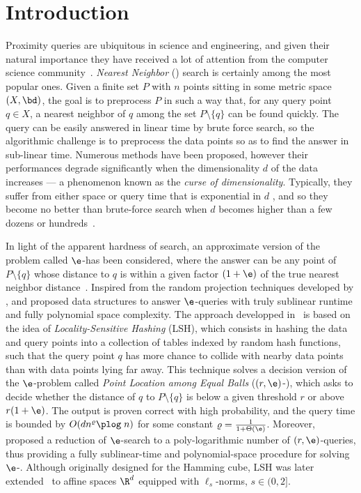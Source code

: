 \section{Introduction}


Proximity queries are ubiquitous in science and engineering, and given
their natural importance they have received a lot of attention from
the computer science community~\citep{Clarkson99, Clarkson06, Indyk04,
  SDI05}. {\em Nearest Neighbor} (\nn) search is certainly among the
most popular ones. Given a finite set $P$ with $n$ points sitting in
some metric space $(X,\bd)$, the goal is to preprocess $P$ in such a
way that, for any query point $q\in X$, a nearest neighbor of $q$
among the set $P\setminus\{q\}$ can be found quickly.  The \nn query
can be easily answered in linear time by brute force search, so the
algorithmic challenge is to preprocess the data points so as to find
the answer in sub-linear time. Numerous methods have been proposed,
however their performances degrade significantly when the
dimensionality $d$ of the data increases --- a phenomenon known as the
{\em curse of dimensionality}.  Typically, they suffer
from either space or query time that is exponential in $d$ , and so
they become no better than brute-force search when $d$ becomes higher
than a few dozens or hundreds~\cite{WSB98}.

In light of the apparent hardness of \nn search, an approximate
version of the problem called $\e$-\nn has been considered, where the
answer can be any point of $P\setminus\{q\}$ whose distance to $q$ is
within a given factor $(1+\e)$ of the true nearest neighbor
distance~\citep{AMNSW98, Clarkson94, IM98, Kleinberg97,
  KOR98}. Inspired from the random projection techniques developed by
\citet{Kleinberg97}, \citet{IM98} and \citet{KOR98} proposed data
structures to answer $\e$-\nn queries with truly sublinear runtime and
fully polynomial space complexity. The approach developped
in~\cite{IM98} is based on the idea of {\em Locality-Sensitive
  Hashing} (LSH), which consists in hashing the data and query points
into a collection of tables indexed by random hash functions, such
that the query point $q$ has more chance to collide with nearby data
points than with data points lying far away. This technique solves a
decision version of the $\e$-\nn problem called {\em Point Location
  among Equal Balls} ($(r,\e)$-\pleb), which asks to decide whether
the distance of $q$ to $P\setminus\{q\}$ is below a given threshold
$r$ or above $r(1+\e)$.  The output is proven correct with high
probability, and the query time is bounded by $O(dn^\varrho\plog\;n)$
for some constant $\varrho = \frac{1}{1+\Theta(\e)}$. Moreover,
\citet{IM98} proposed a reduction of $\e$-\nn search to a
poly-logarithmic number of $(r,\e)$-\pleb queries, thus providing a
fully sublinear-time and polynomial-space procedure for solving
$\e$-\nn. Although originally designed for the Hamming cube, LSH was
later extended~\cite{AI06, DIIM04, HarPeledIndykMotwani} to affine
spaces $\R^d$ equipped with $\ell_s$-norms, $s\in (0,2]$.


